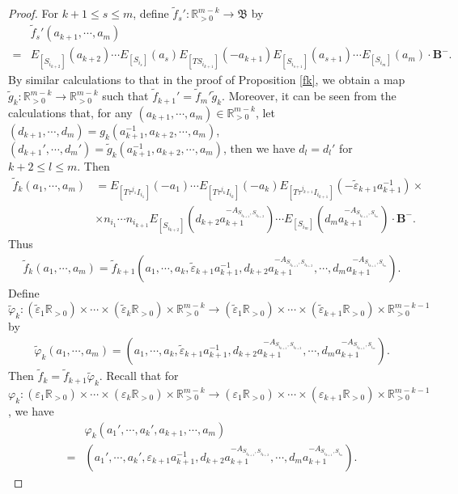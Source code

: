 \documentclass[12pt]{amsart}
\begin{document}
\begin{proof}
    For $k+1\leq s\leq m$, define $\tilde{f}_s':\mathbb{R}_{>0}^{m-k}\rightarrow\mathfrak{B}$ by 
    \begin{align*}
        &\tilde{f}_s'(a_{k+1},\cdots,a_m)\\
        =&E_{[S_{i_{k+2}}]}(a_{k+2})\cdots E_{[S_{i_s}]}(a_s)E_{[TS_{i_{k+1}}]}(-a_{k+1})E_{[S_{i_{s+1}}]}(a_{s+1})\cdots E_{[S_{i_m}]}(a_m) \cdot \mathbf{B}^-.
    \end{align*}
    By similar calculations to that in the proof of Proposition \ref{fk}, we obtain a map $\tilde{g}_k:\mathbb{R}_{>0}^{m-k}\rightarrow \mathbb{R}_{>0}^{m-k}$ such that $\tilde{f}_{k+1}'=\tilde{f}_m'\tilde{g}_k$.
    Moreover, it can be seen from the calculations that, for any $(a_{k+1},\cdots,a_m)\in\mathbb{R}_{>0}^{m-k}$, let $(d_{k+1},\cdots,d_m)=g_k(a_{k+1}^{-1},a_{k+2},\cdots,a_m)$, $(d_{k+1}',\cdots,d_m')=\tilde{g}_k(a_{k+1}^{-1},a_{k+2},\cdots,a_m)$, then we have $d_l=d_l'$ for $k+2 \leq l\leq m$. 
    Then 
    \begin{align*}
         \tilde{f}_k(a_1,\cdots,a_m)&= E_{[T\tau^{j_1}I_{i_1}]}(-a_1)\cdots E_{[T\tau^{j_k}I_{i_k}]}(-a_k) E_{[T\tau^{j_{k+1}}I_{i_{k+1}}]}(-\tilde{\varepsilon}_{k+1}a_{k+1}^{-1})\times \\
        & \times  n_{i_1}\cdots n_{i_{k+1}}   E_{[S_{i_{k+2}}]}(d_{k+2}a_{k+1}^{-A_{S_{i_{k+1}},S_{i_{k+2}}}}) \cdots E_{[S_{i_m}]}(d_ma_{k+1}^{-A_{S_{i_{k+1}},S_{i_m}}})\cdot \mathbf{B}^-.
    \end{align*}
    Thus 
    \begin{align*}
        \tilde{f}_k(a_1,\cdots,a_m)=\tilde{f}_{k+1}(a_1,\cdots,a_k,\tilde{\varepsilon}_{k+1}a_{k+1}^{-1},d_{k+2}a_{k+1}^{-A_{S_{i_{k+1}},S_{i_{k+2}}}},\cdots,d_ma_{k+1}^{-A_{S_{i_{k+1}},S_{i_m}}}).
    \end{align*}
    Define $\tilde{\varphi}_k:(\tilde{\varepsilon}_1\mathbb{R}_{>0})\times \cdots \times (\tilde{\varepsilon}_k\mathbb{R}_{>0})\times \mathbb{R}_{>0}^{m-k}\rightarrow (\tilde{\varepsilon}_1\mathbb{R}_{>0})\times \cdots \times (\tilde{\varepsilon}_{k+1}\mathbb{R}_{>0})\times \mathbb{R}_{>0}^{m-k-1}$ by 
    \begin{align*}
        \tilde{\varphi}_k(a_1,\cdots,a_m)=(a_1,\cdots,a_k,\tilde{\varepsilon}_{k+1}a_{k+1}^{-1},d_{k+2}a_{k+1}^{-A_{S_{i_{k+1}},S_{i_{k+2}}}},\cdots,d_ma_{k+1}^{-A_{S_{i_{k+1}},S_{i_m}}}).
    \end{align*}
    Then $\tilde{f}_k=\tilde{f}_{k+1}\tilde{\varphi}_k$.
    Recall that for $\varphi_k:(\varepsilon_1\mathbb{R}_{>0})\times \cdots \times (\varepsilon_k\mathbb{R}_{>0})\times \mathbb{R}_{>0}^{m-k}\rightarrow (\varepsilon_1\mathbb{R}_{>0})\times \cdots \times (\varepsilon_{k+1}\mathbb{R}_{>0})\times \mathbb{R}_{>0}^{m-k-1}$,
    we have 
    \begin{align*}
        &\varphi_k(a_1',\cdots,a_k',a_{k+1},\cdots,a_m)\\
        =&(a_1',\cdots,a_k',\varepsilon_{k+1}a_{k+1}^{-1},d_{k+2}a_{k+1}^{-A_{S_{i_{k+1}},S_{i_{k+2}}}},\cdots,d_ma_{k+1}^{-A_{S_{i_{k+1}},S_{i_m}}}).
    \end{align*}


\end{proof}
\end{document}
